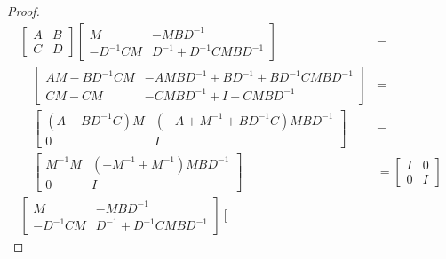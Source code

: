 \begin{proof}
    \begin{align*}
        \left[\begin{array}{cc}
                  A&B\\
                  C&D
        \end{array}\right]\left[\begin{array}{cc}
                                    M&-MBD^{-1}\\
                                    -D^{-1}CM&D^{-1}+D^{-1}CMBD^{-1}
        \end{array}\right]&=\\
                                \quad\left[\begin{array}{cc}
                                         AM-BD^{-1}CM&-AMBD^{-1}+BD^{-1}+BD^{-1}CMBD^{-1}\\
                                         CM-CM&-CMBD^{-1}+I+CMBD^{-1}
                                \end{array}\right]&=\\
                                \quad\left[\begin{array}{cc}
                                               (A-BD^{-1}C)M&(-A+M^{-1}+BD^{-1}C)MBD^{-1}\\
                                               0&I
                                \end{array}\right]&=\\
                                \quad\left[\begin{array}{cc}
                                               M^{-1}M&(-M^{-1}+M^{-1})MBD^{-1}\\
                                               0&I
                                \end{array}\right]&=\left[\begin{array}{cc}
                                                              I&0\\
                                                              0&I
                                                           \end{array}\right]\\
        \left[\begin{array}{cc}
                  M&-MBD^{-1}\\
                  -D^{-1}CM&D^{-1}+D^{-1}CMBD^{-1}
        \end{array}\right]\left[\begin{array}{cc}

\end{array}
\end{align*}
\end{proof}
